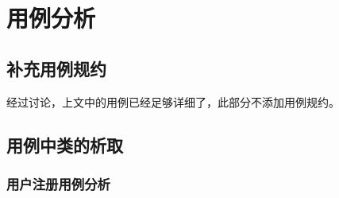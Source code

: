 \chapter{用例分析}
	
\section{补充用例规约}
	经过讨论，上文中的用例已经足够详细了，此部分不添加用例规约。
\section{用例中类的析取}
	\subsection{用户注册用例分析} %
	\label{sub:用户注册用例分析}

